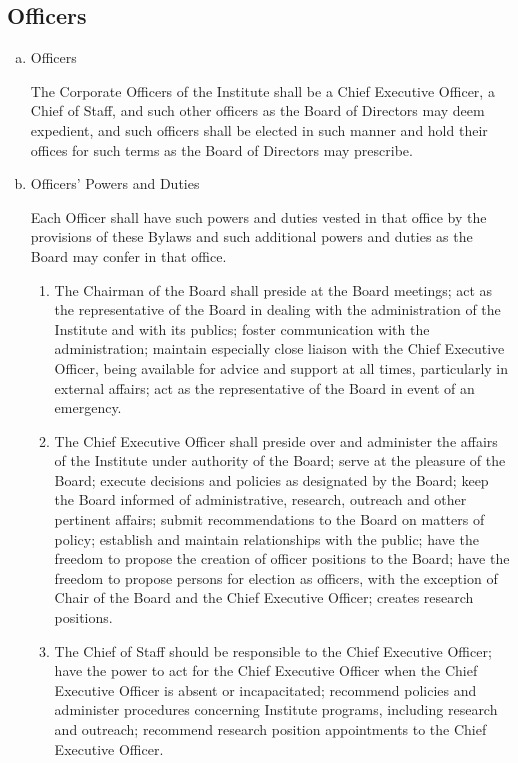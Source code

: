 \subsection{Officers}

\begin{enumerate}[(a)]
\item Officers

The Corporate Officers of the Institute shall be a Chief Executive Officer, a Chief of Staff, and such other officers as the Board of Directors may deem expedient, and such officers shall be elected in such manner and hold their offices for such terms as the Board of Directors may prescribe.

\item Officers' Powers and Duties

Each Officer shall have such powers and duties vested in that office by the provisions of these Bylaws and such additional powers and duties as the Board may confer in that office.

\begin{enumerate}
\item The Chairman of the Board shall preside at the Board meetings; act as the representative of the Board in dealing with the administration of the Institute and with its publics; foster communication with the administration; maintain especially close liaison with the Chief Executive Officer, being available for advice and support at all times, particularly in external affairs; act as the representative of the Board in event of an emergency.

\item The Chief Executive Officer shall preside over and administer the affairs of the Institute under authority of the Board; serve at the pleasure of the Board; execute decisions and policies as designated by the Board; keep the Board informed of administrative, research, outreach and other pertinent affairs; submit recommendations to the Board on matters of policy; establish and maintain relationships with the public; have the freedom to propose the creation of officer positions to the Board; have the freedom to propose persons for election as officers, with the exception of Chair of the Board and the Chief Executive Officer; creates research positions.

\item The Chief of Staff should be responsible to the Chief Executive Officer; have the power to act for the Chief Executive Officer when the Chief Executive Officer is absent or incapacitated; recommend policies and administer procedures concerning Institute programs, including research and outreach; recommend research position appointments to the Chief Executive Officer.
\end{enumerate}



\end{enumerate}

